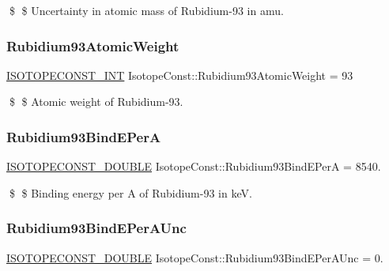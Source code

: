 \$ \$ Uncertainty in atomic mass of Rubidium-\/93 in amu. \mbox{\label{group___isotope_const-_rubidium-_rb93_ga54f36be64fd3e0df814db06fb6b81179}} 
\subsubsection{\texorpdfstring{Rubidium93\+Atomic\+Weight}{Rubidium93AtomicWeight}}
{\footnotesize\ttfamily \mbox{\hyperlink{group___isotope_const-_macros_ga5f18360b3e99483a35c32d789e62621c}{I\+S\+O\+T\+O\+P\+E\+C\+O\+N\+S\+T\+\_\+\+I\+NT}} Isotope\+Const\+::\+Rubidium93\+Atomic\+Weight = 93}

\$ \$ Atomic weight of Rubidium-\/93. \mbox{\label{group___isotope_const-_rubidium-_rb93_gac8802728f6e0d793caab4dc0a4609c81}} 
\subsubsection{\texorpdfstring{Rubidium93\+Bind\+E\+PerA}{Rubidium93BindEPerA}}
{\footnotesize\ttfamily \mbox{\hyperlink{group___isotope_const-_macros_ga8f45a7272ce02c0b4c65c44636ed719a}{I\+S\+O\+T\+O\+P\+E\+C\+O\+N\+S\+T\+\_\+\+D\+O\+U\+B\+LE}} Isotope\+Const\+::\+Rubidium93\+Bind\+E\+PerA = 8540.}

\$ \$ Binding energy per A of Rubidium-\/93 in keV. \mbox{\label{group___isotope_const-_rubidium-_rb93_gad7eecc19155521c6224763b3f9f5a43c}} 
\subsubsection{\texorpdfstring{Rubidium93\+Bind\+E\+Per\+A\+Unc}{Rubidium93BindEPerAUnc}}
{\footnotesize\ttfamily \mbox{\hyperlink{group___isotope_const-_macros_ga8f45a7272ce02c0b4c65c44636ed719a}{I\+S\+O\+T\+O\+P\+E\+C\+O\+N\+S\+T\+\_\+\+D\+O\+U\+B\+LE}} Isotope\+Const\+::\+Rubidium93\+Bind\+E\+Per\+A\+Unc = 0.}

